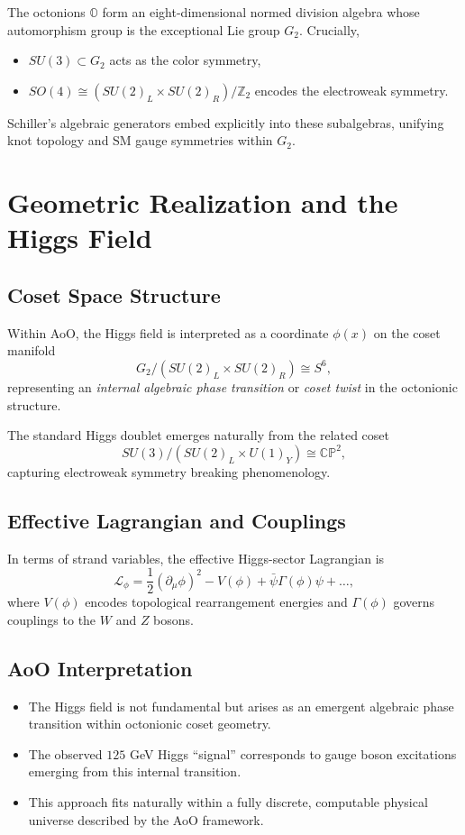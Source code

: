 \documentclass[12pt]{article}
\begin{document}
The octonions $\mathbb{O}$ form an eight-dimensional normed division algebra whose automorphism group is the exceptional Lie group $G_2$. Crucially,

\begin{itemize}
    \item $SU(3) \subset G_2$ acts as the color symmetry,
    \item $SO(4) \cong (SU(2)_L \times SU(2)_R)/\mathbb{Z}_2$ encodes the electroweak symmetry.
\end{itemize}

Schiller’s algebraic generators embed explicitly into these subalgebras, unifying knot topology and SM gauge symmetries within $G_2$.

\section{Geometric Realization and the Higgs Field}

\subsection{Coset Space Structure}

Within AoO, the Higgs field is interpreted as a coordinate $\phi(x)$ on the coset manifold
\[
G_2 / (SU(2)_L \times SU(2)_R) \cong S^6,
\]
representing an \emph{internal algebraic phase transition} or \emph{coset twist} in the octonionic structure.

The standard Higgs doublet emerges naturally from the related coset
\[
SU(3) / (SU(2)_L \times U(1)_Y) \cong \mathbb{CP}^2,
\]
capturing electroweak symmetry breaking phenomenology.

\subsection{Effective Lagrangian and Couplings}

In terms of strand variables, the effective Higgs-sector Lagrangian is
\[
\mathcal{L}_\phi = \frac{1}{2} (\partial_\mu \phi)^2 - V(\phi) + \bar{\psi} \Gamma(\phi) \psi + \dots,
\]
where $V(\phi)$ encodes topological rearrangement energies and $\Gamma(\phi)$ governs couplings to the $W$ and $Z$ bosons.

\subsection{AoO Interpretation}

\begin{itemize}
    \item The Higgs field is not fundamental but arises as an emergent algebraic phase transition within octonionic coset geometry.
    \item The observed $125$ GeV Higgs “signal” corresponds to gauge boson excitations emerging from this internal transition.
    \item This approach fits naturally within a fully discrete, computable physical universe described by the AoO framework.
\end{itemize}
\end{document}
